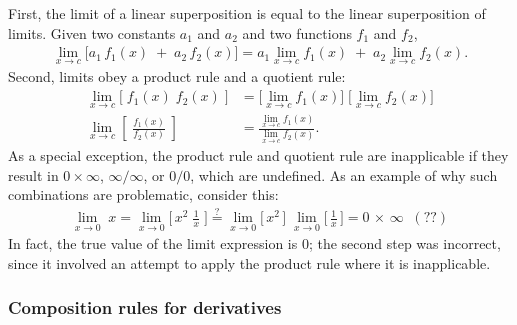 \documentclass[10pt,a4paper]{article}
\begin{document}
First, the limit of a linear superposition is equal to the linear
superposition of limits. Given two constants $a_1$ and $a_2$ and two
functions $f_1$ and $f_2$,
\begin{align}
  \lim_{x \rightarrow c} \big[a_1 \,f_1(x) \;+\; a_2\, f_2(x)\big] = a_1 \lim_{x \rightarrow c} f_1(x) \;+\; a_2 \lim_{x \rightarrow c} f_2(x).
\end{align}
Second, limits obey a product rule and a quotient rule:
\begin{align}
  \lim_{x \rightarrow c} \big[\;f_1(x) \; f_2(x)\;\big] &= \Big[\lim_{x \rightarrow c} f_1(x)\Big]\;\Big[\lim_{x \rightarrow c} f_2(x)\Big]
  \\ \lim_{x \rightarrow c} \left[\;\frac{f_1(x)}{f_2(x)}\;\right] &= \frac{\lim_{x \rightarrow c} f_1(x)}{\lim_{x \rightarrow c} f_2(x)}.
\end{align}
As a special exception, the product rule and quotient rule are
inapplicable if they result in $0 \times \infty$, $\infty/\infty$, or
$0/0$, which are undefined. As an example of why such combinations are
problematic, consider this:
\begin{align*}
  \lim_{x \rightarrow 0} \;x = \lim_{x \rightarrow 0}\Big[\,x^2\;\frac{1}{x}\;\Big] \overset{?}{=} \lim_{x \rightarrow 0}\Big[\,x^2\,\Big]\; \lim_{x \rightarrow 0}\Big[\,\frac{1}{x}\,\Big] = 0 \, \times \, \infty \;\;(??)
\end{align*}
In fact, the true value of the limit expression is 0; the second step
was incorrect, since it involved an attempt to apply the product rule
where it is inapplicable.

\subsubsection{Composition rules for derivatives}
\label{composition-rules-for-derivatives}
\end{document}
